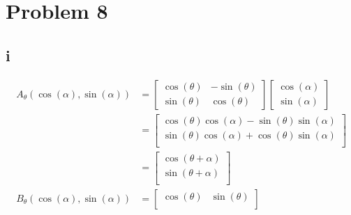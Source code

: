 \documentclass[12pt,letterpaper]{article}
\theoremstyle{definition}
\begin{document}
\section*{Problem 8}
\subsection*{i}

\begin{align*}
  A_{\theta}(\cos(\alpha), \sin(\alpha)) &=
                                           \begin{bmatrix}
                                             \cos(\theta) & -\sin(\theta) \\
                                             \sin(\theta) & \cos(\theta)
                                           \end{bmatrix}
                                                  \begin{bmatrix}
                                                    \cos(\alpha) \\
                                                    \sin(\alpha)
                                                  \end{bmatrix} \\
                                         &=
                                           \begin{bmatrix}
                                             \cos(\theta) \cos(\alpha) - \sin(\theta) \sin(\alpha) \\
                                             \sin(\theta) \cos(\alpha) + \cos(\theta) \sin(\alpha) \\
                                           \end{bmatrix} \\
                                         &=
                                           \begin{bmatrix}
                                             \cos(\theta + \alpha) \\
                                             \sin(\theta + \alpha) \\
                                           \end{bmatrix} \\
  B_{\theta}(\cos(\alpha), \sin(\alpha)) &=
                                           \begin{bmatrix}
                                             \cos(\theta) & \sin(\theta) \\

\end{bmatrix}
\end{align*}
\end{document}
